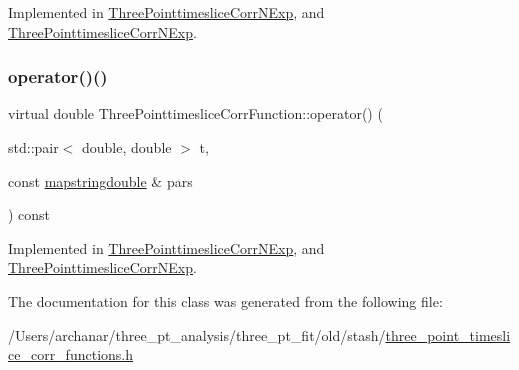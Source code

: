 Implemented in \mbox{\hyperlink{classThreePointtimesliceCorrNExp_a4d3143ae44c362e4dae6221ace8f1c02}{Three\+Pointtimeslice\+Corr\+N\+Exp}}, and \mbox{\hyperlink{classThreePointtimesliceCorrNExp_a4d3143ae44c362e4dae6221ace8f1c02}{Three\+Pointtimeslice\+Corr\+N\+Exp}}.

\mbox{\label{classThreePointtimesliceCorrFunction_a9d86382fdb47e87d53aea1878abd1da0}} 
\subsubsection{\texorpdfstring{operator()()}{operator()()}\hspace{0.1cm}{\footnotesize\ttfamily [4/4]}}
{\footnotesize\ttfamily virtual double Three\+Pointtimeslice\+Corr\+Function\+::operator() (\begin{DoxyParamCaption}\item[{std\+::pair$<$ double, double $>$}]{t,  }\item[{const \mbox{\hyperlink{lib_2fitting__lib_2includes_8h_a647b481c557c7966517f753340a81d13}{mapstringdouble}} \&}]{pars }\end{DoxyParamCaption}) const\hspace{0.3cm}{\ttfamily [pure virtual]}}



Implemented in \mbox{\hyperlink{classThreePointtimesliceCorrNExp_a32c3a96362aae58e8eb5a5eb8f5aafc9}{Three\+Pointtimeslice\+Corr\+N\+Exp}}, and \mbox{\hyperlink{classThreePointtimesliceCorrNExp_a32c3a96362aae58e8eb5a5eb8f5aafc9}{Three\+Pointtimeslice\+Corr\+N\+Exp}}.



The documentation for this class was generated from the following file\+:\begin{DoxyCompactItemize}
\item 
/\+Users/archanar/three\+\_\+pt\+\_\+analysis/three\+\_\+pt\+\_\+fit/old/stash/\mbox{\hyperlink{old_2stash_2three__point__timeslice__corr__functions_8h}{three\+\_\+point\+\_\+timeslice\+\_\+corr\+\_\+functions.\+h}}\end{DoxyCompactItemize}
